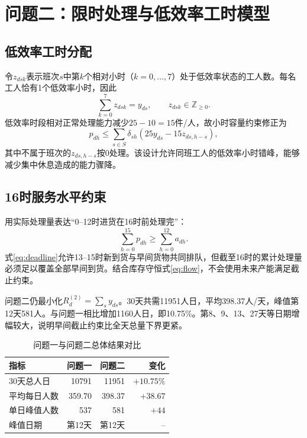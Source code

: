 \section{问题二：限时处理与低效率工时模型}

\subsection{低效率工时分配}

令$z_{dsk}$表示班次$s$中第$k$个相对小时（$k=0,\ldots,7$）处于低效率状态的工人数。每名工人恰有1个低效率小时，因此
\begin{equation}
\sum_{k=0}^{7}z_{dsk}=y_{ds},\qquad z_{dsk}\in\mathbb Z_{\ge0}.
\label{eq:lowhour}
\end{equation}
低效率时段相对正常处理能力减少$25-10=15$件/人，故小时容量约束修正为
\begin{equation}
p_{dh}\le \sum_{s\in S}\delta_{sh}\left(25y_{ds}-15z_{ds,h-s}\right),
\label{eq:capacity2}
\end{equation}
其中不属于班次的$z_{ds,h-s}$按0处理。该设计允许同班工人的低效率小时错峰，能够减少集中休息造成的能力骤降。

\subsection{16时服务水平约束}

用实际处理量表达“0--12时进货在16时前处理完”：
\begin{equation}
\sum_{h=0}^{15}p_{dh}\ge\sum_{h=0}^{12}a_{dh}.
\label{eq:deadline}
\end{equation}
式\eqref{eq:deadline}允许13--15时新到货与早间货物共同排队，但截至16时的累计处理量必须足以覆盖全部早间到货。结合库存守恒式\eqref{eq:flow}，不会使用未来产能满足截止约束。

问题二仍最小化$R_d^{(2)}=\sum_sy_{ds}$。30天共需11951人日，平均398.37人/天，峰值第12天581人。与问题一相比增加1160人日，即10.75\%。第8、9、13、27天等日期增幅较大，说明早间截止约束比全天总量下界更紧。

\begin{table}[htbp]
\centering
\caption{问题一与问题二总体结果对比}
\label{tab:summary}
\begin{tabular}{lrrr}
\toprule
指标 & 问题一 & 问题二 & 变化\\
\midrule
30天总人日 & 10791 & 11951 & $+10.75\%$\\
平均每日人数 & 359.70 & 398.37 & $+38.67$\\
单日峰值人数 & 537 & 581 & $+44$\\
峰值日期 & 第12天 & 第12天 & --\\
\bottomrule
\end{tabular}
\end{table}
